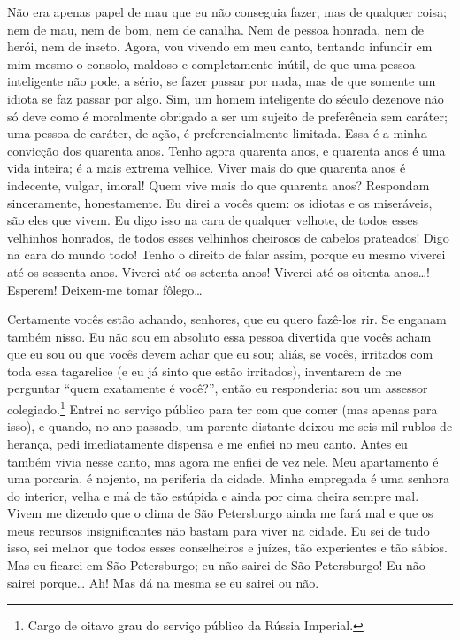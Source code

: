 Não era apenas papel de mau que eu não conseguia fazer, mas de qualquer
coisa; nem de mau, nem de bom, nem de canalha. Nem de pessoa honrada,
nem de herói, nem de inseto. Agora, vou vivendo em meu canto, tentando
infundir em mim mesmo o consolo, maldoso e completamente inútil, de que
uma pessoa inteligente não pode, a sério, se fazer passar por nada, mas
de que somente um idiota se faz passar por algo. Sim, um homem
inteligente do século dezenove não só deve como é moralmente obrigado a ser
um sujeito de preferência sem caráter; uma pessoa de caráter, de ação,
é preferencialmente limitada. Essa é a minha convicção dos quarenta
anos. Tenho agora quarenta anos, e quarenta anos é uma vida inteira; é
a mais extrema velhice. Viver mais do que quarenta anos é indecente,
vulgar, imoral! Quem vive mais do que quarenta anos? Respondam
sinceramente, honestamente. Eu direi a vocês quem: os idiotas e os
miseráveis, são eles que vivem. Eu digo isso na cara de qualquer
velhote, de todos esses velhinhos honrados, de todos esses velhinhos
cheirosos de cabelos prateados! Digo na cara do mundo todo! Tenho o
direito de falar assim, porque eu mesmo viverei até os sessenta anos.
Viverei até os setenta anos! Viverei até os oitenta anos\ldots{}! Esperem!
Deixem-me tomar fôlego\ldots{}

Certamente vocês estão achando, senhores, que eu quero fazê-los rir. Se
enganam também nisso. Eu não sou em absoluto essa pessoa divertida que
vocês acham que eu sou ou que vocês devem achar que eu sou; aliás, se
vocês, irritados com toda essa tagarelice (e eu já sinto que estão
irritados), inventarem de me perguntar “quem exatamente é você?”, então
eu responderia: sou um assessor colegiado.\footnote{ Cargo de oitavo
grau do serviço público da Rússia Imperial.} Entrei no serviço público
para ter com que comer (mas apenas para isso), e quando, no ano
passado, um parente distante deixou-me seis mil rublos de herança, pedi
imediatamente dispensa e me enfiei no meu canto. Antes eu também vivia
nesse canto, mas agora me enfiei de vez nele. Meu apartamento é uma
porcaria, é nojento, na periferia da cidade. Minha empregada é uma
senhora do interior, velha e má de tão estúpida e ainda por cima cheira
sempre mal. Vivem me dizendo que o clima de São Petersburgo ainda me
fará mal e que os meus recursos insignificantes não bastam para viver
na cidade. Eu sei de tudo isso, sei melhor que todos esses conselheiros
e juízes, tão experientes e tão sábios. Mas eu ficarei em São
Petersburgo; eu não sairei de São Petersburgo! Eu não sairei porque\ldots{}
Ah! Mas dá na mesma se eu sairei ou não.

